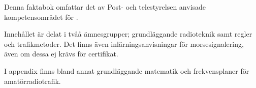 Denna faktabok omfattar det av Post- och telestyrelsen anvisade
kompetensområdet för .

Innehållet är delat i tvåå ämnesgrupper; grundläggande radioteknik
samt regler och trafikmetoder.
Det finns även inlärningsanvisningar för morsesignalering,
även om dessa ej krävs för certifikat.

I appendix finns bland annat grundläggande matematik
och frekvensplaner för amatörradiotrafik.

